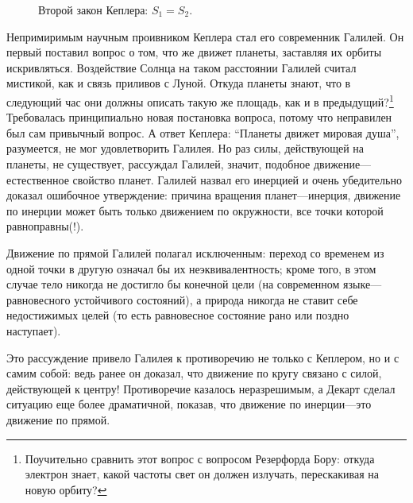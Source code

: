 \documentclass[twocolumn,10pt]{article}
\begin{document}
\begin{figure}[ht]
\begin{center}
\end{center}
\caption{Второй закон Кеплера: $S_1=S_2$.}
\end{figure}

Непримиримым научным проивником Кеплера стал его современник Галилей. Он первый поставил вопрос о том, что же движет планеты, заставляя их орбиты искривляться. Воздействие Солнца на таком расстоянии Галилей считал мистикой, как и связь приливов с Луной. Откуда планеты знают, что в следующий час они должны описать такую же площадь, как и в предыдущий?\footnote{Поучительно сравнить этот вопрос с вопросом Резерфорда Бору: откуда электрон знает, какой частоты свет он должен излучать, перескакивая на новую орбиту?} Требовалась принципиально новая постановка вопроса, потому что неправилен был сам привычный вопрос. А ответ Кеплера: ``Планеты движет мировая душа'', разумеется, не мог удовлетворить Галилея. Но раз силы, действующей на планеты, не существует, рассуждал Галилей, значит, подобное движение---естественное свойство планет. Галилей назвал его инерцией и очень убедительно доказал ошибочное утверждение: причина вращения планет---инерция, движение по инерции может быть только движением по окружности, все точки которой равноправны(!).

Движение по прямой Галилей полагал исключенным: переход со временем из одной точки в другую означал бы их неэквивалентность; кроме того, в этом случае тело никогда не достигло бы конечной цели (на современном языке---равновесного устойчивого состояний), а природа никогда не ставит себе недостижимых целей (то есть равновесное состояние рано или поздно наступает).

Это рассуждение привело Галилея к противоречию не только с Кеплером, но и с самим собой: ведь ранее он доказал, что движение по кругу связано с силой, действующей к центру! Противоречие казалось неразрешимым, а Декарт сделал ситуацию еще более драматичной, показав, что движение по инерции---это движение по прямой.
\end{document}
